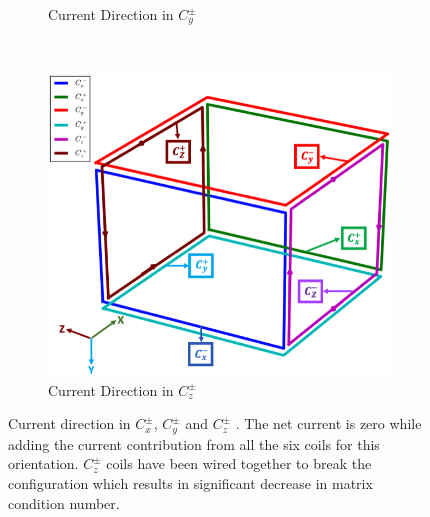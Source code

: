 \begin{figure}
\begin{subfigure}{.5\linewidth}
        \caption{Current Direction in $C_y^{\pm}$}
        \label{fig:c3}
    \end{subfigure}\\[1ex]
    \begin{subfigure}{\linewidth}
        \centering
        \includegraphics[scale=.33]{Images/c5}
        \caption{Current Direction in $C_z^{\pm}$}
        \label{fig:c5}
    \end{subfigure}
    \caption[short]{Current direction in $C_x^{\pm}$, $C_y^{\pm}$ and $C_z^{\pm}$ . The net current is zero while adding the current contribution from all the six coils for this orientation. $C_z^{\pm}$ coils have been wired together to break the configuration which results in significant decrease in matrix condition number. }
    \label{fig:cDir}
\end{figure}

